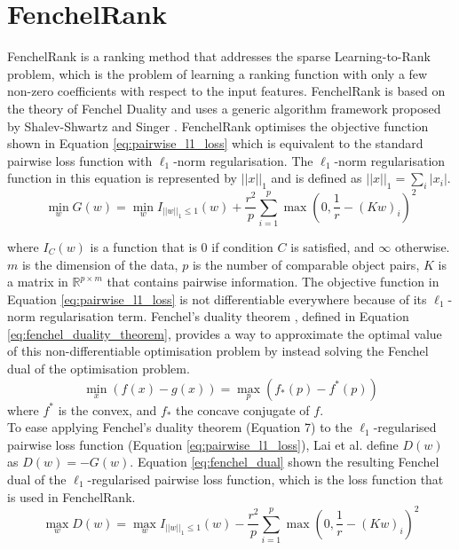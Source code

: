 \section{FenchelRank}
FenchelRank \cite{Lai2013} is a ranking method that addresses the sparse Learning-to-Rank problem, which is the problem of learning a ranking function with only a few non-zero coefficients with respect to the input features. FenchelRank is based on the theory of Fenchel Duality \cite{Rifkin2007} and uses a generic algorithm framework proposed by Shalev-Shwartz and Singer \cite{Shalev-Shwartz2010}. FenchelRank optimises the objective function shown in Equation \ref{eq:pairwise_l1_loss} which is equivalent to the standard pairwise loss function with $\ell_1$-norm regularisation. The $\ell_1$-norm regularisation function in this equation is represented by $||x||_1$ and is defined as $||x||_1=\sum\nolimits_i|x_i|$.
\begin{equation}
\min_w G(w) = \min_w I_{||w||_{1} \le 1}(w) + \frac{r^2}{p} \sum\limits_{i=1}^{p}\max(0,\frac{1}{r}-(Kw)_i)^2
\label{eq:pairwise_l1_loss}
\end{equation}

\noindent where $I_{C}(w)$ is a function that is 0 if condition $C$ is satisfied, and $\infty$ otherwise. $m$ is the dimension of the data, $p$ is the number of comparable object pairs, $K$ is a matrix in $\mathbb{R}^{p \times m}$ that contains pairwise information. The objective function in Equation \ref{eq:pairwise_l1_loss} is not differentiable everywhere because of its $\ell_1$-norm regularisation term. Fenchel's duality theorem \cite{Rifkin2007}, defined in Equation \ref{eq:fenchel_duality_theorem}, provides a way to approximate the optimal value of this non-differentiable optimisation problem by instead solving the Fenchel dual of the optimisation problem.
\begin{equation}
\min_x(f(x)-g(x)) = \max_p(f_*(p)-f^*(p))
\label{eq:fenchel_duality_theorem}
\end{equation}
\noindent where $f^*$ is the convex, and $f_*$ the concave conjugate of $f$.\\

To ease applying Fenchel's duality theorem (Equation 7) to the $\ell_1$-regularised pairwise loss function (Equation \ref{eq:pairwise_l1_loss}), Lai et al. define $D(w)$ as $D(w) = -G(w)$. Equation \ref{eq:fenchel_dual} shown the resulting Fenchel dual of the $\ell_1$-regularised pairwise loss function, which is the loss function that is used in FenchelRank.
\begin{equation}
\max_w D(w) = \max_w I_{||w||_{1} \le 1}(w) - \frac{r^2}{p} \sum\limits_{i=1}^{p}\max(0,\frac{1}{r}-(Kw)_i)^2
\label{eq:fenchel_dual}
\end{equation}

